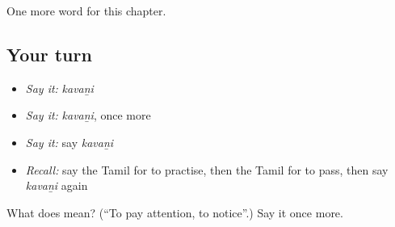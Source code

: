 \begin{grammarlens}[title={What you've built}]
One more word for this chapter.
\end{grammarlens}

\subsection*{Your turn}
\begin{itemize}
\raggedright
  \item \emph{Say it:} \emph{kavaṉi}
  \item \emph{Say it:} \emph{kavaṉi}, once more
  \item \emph{Say it:} say \emph{kavaṉi}
  \item \emph{Recall:} say the Tamil for to practise, then the Tamil for to pass, then say \emph{kavaṉi} again
\end{itemize}

\begin{tcolorbox}[breakable,colback=teal!4,colframe=teal!35!black,title={Before you move on}]
What does  mean? (\textquotedblleft{}To pay attention, to notice\textquotedblright{}.) Say it once more.
\end{tcolorbox}
